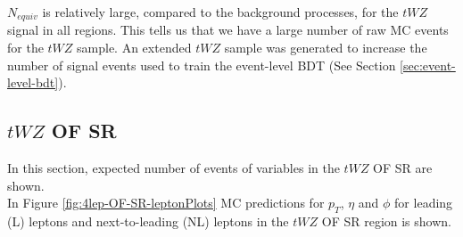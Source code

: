
$N_{equiv}$ is relatively large, compared to the background processes, for the $tWZ$ signal in all regions. This tells us that we have a large number of raw MC events for the $tWZ$ sample. An extended $tWZ$ sample was generated to increase the number of signal events used to train the event-level BDT (See Section \ref{sec:event-level-bdt}).



\subsection{$tWZ$ OF SR}
\label{sec:controlplotstetralepton-tWZ-OF-SR}


In this section, expected number of events of variables in the $tWZ$ OF SR are shown.\\

In Figure \ref{fig:4lep-OF-SR-leptonPlots} MC predictions for $p_{T}$, $\eta$ and $\phi$ for leading (L) leptons and next-to-leading (NL) leptons in the $tWZ$ OF SR region is shown.

